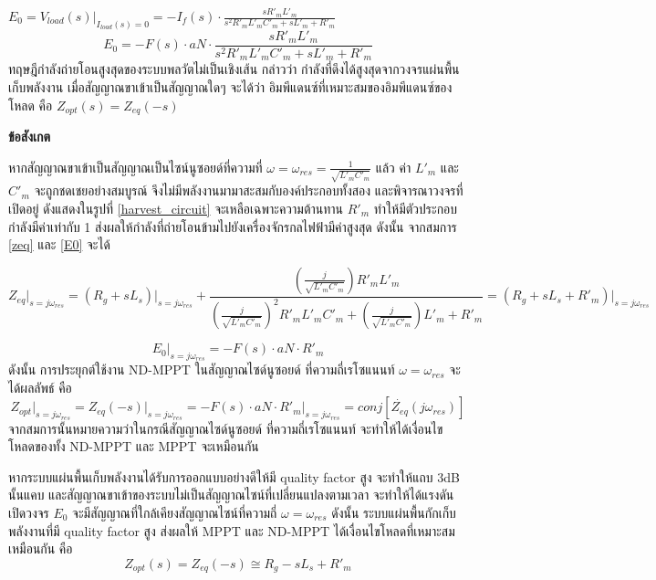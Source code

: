 \documentclass[11pt,a4paper]{article}
\begin{document}
$E_{0} = V_{load}(s)\vert_{I_{load}(s) = 0} = -I_{f}(s) \cdot \frac{ sR'_{m}L'_{m} }{ s^2R'_{m}L'_{m}C'_{m} + sL'_{m} + R'_{m}}$
\begin{equation}\label{E0}
    E_{0} = -F(s) \cdot aN \cdot \frac{ sR'_{m}L'_{m} }{ s^2R'_{m}L'_{m}C'_{m} + sL'_{m} + R'_{m}}
\end{equation}
ทฤษฎีกำลังถ่ายโอนสูงสุดของระบบพลวัตไม่เป็นเชิงเส้น กล่าวว่า กำลังที่ดึงได้สูงสุดจากวงจรแผ่นพื้นเก็บพลังงาน เมื่อสัญญาณขาเข้าเป็นสัญญาณใดๆ จะได้ว่า อิมพีแดนซ์ที่เหมาะสมของอิมพีแดนซ์ของโหลด คือ
$Z_{opt}(s)= Z_{eq}(-s)$

\textbf{ข้อสังเกต}

หากสัญญาณขาเข้าเป็นสัญญาณเป็นไซน์นูซอยด์ที่ความที่ $\omega = \omega_{res} = \frac{1}{\sqrt{L'_{m}C'_{m}}}$ แล้ว
ค่า $ L'_{m} $ และ $ C'_{m} $ จะถูกชดเชยอย่างสมบูรณ์ จึงไม่มีพลังงานมามาสะสมกับองค์ประกอบทั้งสอง และพิจารณาวงจรที่เปิดอยู่ ดังแสดงในรูปที่ \ref{harvest_circuit} จะเหลือเฉพาะความต้านทาน $R'_{m}$ ทำให้มีตัวประกอบกำลังมีค่าเท่ากับ 1 ส่งผลให้กำลังที่ถ่ายโอนข้ามไปยังเครื่องจักรกลไฟฟ้ามีค่าสูงสุด ดังนั้น จากสมการ \ref{zeq} และ \ref{E0} จะได้

\begin{equation}
    Z_{eq}\vert_{s = j\omega_{res}} = (R_{g} + sL_{s}) \vert_{s = j\omega_{res}} + \frac{ ( \frac{j}{\sqrt{L'_{m}C'_{m}}} ) R'_{m}L'_{m} }{ ( \frac{j}{\sqrt{L'_{m}C'_{m}}} )^2R'_{m}L'_{m}C'_{m} + ( \frac{j}{\sqrt{L'_{m}C'_{m}}} )L'_{m} + R'_{m}} = (R_{g} + sL_{s} + R'_{m} )\vert_{s = j\omega_{res}}
\end{equation}

\begin{equation}
    E_{0}\vert_{s = j\omega_{res}} = -F(s) \cdot aN \cdot R'_{m}
\end{equation}
ดังนั้น การประยุกต์ใช้งาน ND-MPPT ในสัญญาณไซด์นูซอยด์ ที่ความถี่เรโซแนนท์ $\omega = \omega_{res}$ จะได้ผลลัพธ์ คือ
\begin{equation}
    Z_{opt}\vert_{s = j\omega_{res}} = Z_{eq}(-s)\vert_{s = j\omega_{res}} = -F(s) \cdot aN \cdot R'_{m} \vert_{s = j\omega_{res}} = conj [ {\dot{ Z_{eq} } (j\omega_{res})} ]
\end{equation}
จากสมการนั้นหมายความว่าในกรณีสัญญาณไซด์นูซอยด์ ที่ความถี่เรโซแนนท์ จะทำให้ได้เงื่อนไขโหลดของทั้ง ND-MPPT และ MPPT จะเหมือนกัน

หากระบบแผ่นพื้นเก็บพลังงานได้รับการออกแบบอย่างดีให้มี quality factor สูง จะทำให้แถบ 3dB นั้นแคบ และสัญญาณขาเข้าของระบบไม่เป็นสัญญาณไซน์ที่เปลี่ยนแปลงตามเวลา
จะทำให้ได้แรงดันเปิดวงจร $E_{0}$ จะมีสัญญาณที่ใกล้เคียงสัญญาณไซน์ที่ความถี่ $\omega = \omega_{res}$ ดังนั้น ระบบแผ่นพื้นกักเก็บพลังงานที่มี quality factor สูง ส่งผลให้ MPPT และ ND-MPPT ได้เงื่อนไขโหลดที่เหมาะสมเหมือนกัน คือ
\begin{equation} \label{}
    Z_{opt}(s)= Z_{eq}(-s) \cong R_g- sL_{s} + R'_{m}
\end{equation}
\end{document}
